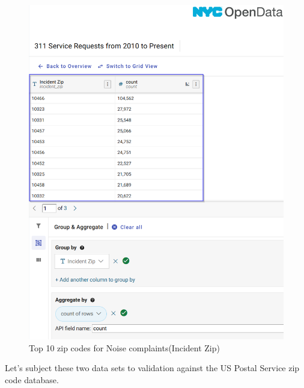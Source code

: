 \documentclass[12pt, titlepage]{article}
\begin{document}
{		\begin{figure}[H]
	    		\centering
	    		\includegraphics[scale = 0.6]{incident_zip_casestudy.png}
	    		\caption{Top 10 zip codes for Noise complaints(Incident Zip)}
	    	\label{fig:casestudy1-incident-zip}
		\end{figure}
		
	Let's subject these two data sets to validation against the US Postal Service zip code database.
	 
}
\end{document}
